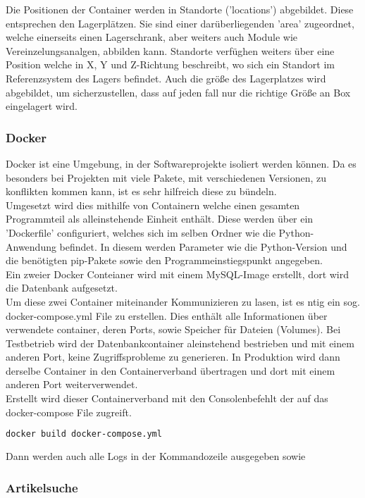Die Positionen der Container werden in Standorte ('locations') abgebildet. Diese entsprechen den Lagerplätzen. Sie sind einer darüberliegenden 'area' zugeordnet, welche einerseits einen Lagerschrank, aber weiters auch Module wie Vereinzelungsanalgen, abbilden kann. Standorte verfüghen weiters über eine Position welche in X, Y und Z-Richtung beschreibt, wo sich ein Standort im Referenzsystem des Lagers befindet. Auch die größe des Lagerplatzes wird abgebildet, um sicherzustellen, dass auf jeden fall nur die richtige Größe an Box eingelagert wird.


\subsubsection{Docker}


    Docker ist eine Umgebung, in der Softwareprojekte isoliert werden können. Da es besonders  bei Projekten mit viele Pakete, mit verschiedenen Versionen, zu konflikten kommen kann, ist es sehr hilfreich diese zu bündeln. \\
    Umgesetzt wird dies mithilfe von Containern welche einen gesamten Programmteil als alleinstehende Einheit enthält. Diese werden über ein 'Dockerfile' configuriert, welches sich im selben Ordner wie die Python-Anwendung befindet. In diesem werden Parameter wie die Python-Version und die benötigten pip-Pakete sowie den Programmeinstiegspunkt angegeben. \\ 
    Ein zweier Docker Conteianer wird mit einem MySQL-Image erstellt, dort wird die Datenbank aufgesetzt. \\
    Um diese zwei Container miteinander Kommunizieren zu lasen, ist es ntig ein sog. docker-compose.yml File zu erstellen. Dies enthält alle Informationen über verwendete container, deren Ports, sowie Speicher für Dateien (Volumes). Bei Testbetrieb wird der Datenbankcontainer aleinstehend bestrieben und mit einem anderen Port, keine Zugriffsprobleme zu generieren. In Produktion wird dann derselbe Container in den Containerverband übertragen und dort mit einem anderen Port weiterverwendet. \\
    Erstellt wird dieser Containerverband mit den Consolenbefehlt der auf das docker-compose File zugreift. 
    \begin{lstlisting}[language=bash]
        docker build docker-compose.yml\end{lstlisting}
    Dann werden auch alle Logs in der Kommandozeile ausgegeben sowie 


\subsubsection{Artikelsuche}
